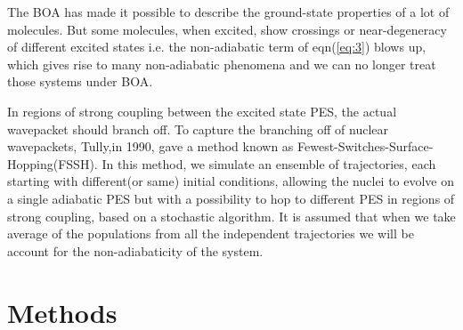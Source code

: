 \documentclass[12pt]{article}
\begin{document}
The BOA has made it possible to describe the ground-state properties of a lot of molecules. But some molecules, when excited, show crossings or near-degeneracy of different excited states i.e. the non-adiabatic term of eqn(\ref{eq:3}) blows up, which gives rise to many non-adiabatic phenomena and we can no longer treat those systems under BOA.
\vspace{2mm}

In regions of strong coupling between the excited state PES, the actual wavepacket should branch off. To capture the branching off of nuclear wavepackets, Tully,in 1990\cite{tully},  gave a method known as Fewest-Switches-Surface-Hopping(FSSH). In this method, we simulate an ensemble of trajectories, each starting with different(or same) initial conditions, allowing the nuclei to evolve on a single adiabatic PES but with a possibility to hop to different PES in regions of strong coupling, based on a stochastic algorithm. It is assumed that when we take average of the populations from all the independent trajectories we will be account for the non-adiabaticity of the system.

\section{Methods}
\end{document}
